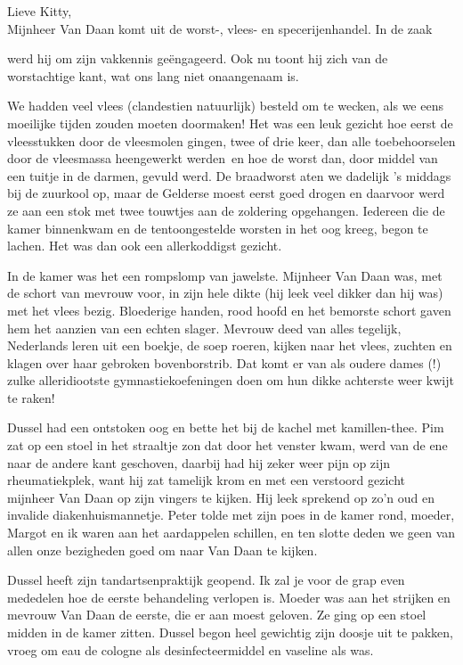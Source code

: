 \documentclass{book}
\begin{document}
Lieve Kitty,\\Mijnheer Van Daan komt uit de worst-, vlees- en
specerijenhandel. In de zaak

werd hij om zijn vakkennis geëngageerd. Ook nu toont hij zich van de
worstachtige kant, wat ons lang niet onaangenaam is.

We hadden veel vlees (clandestien natuurlijk) besteld om te wecken, als
we eens moeilijke tijden zouden moeten doormaken! Het was een leuk
gezicht hoe eerst de vleesstukken door de vleesmolen gingen, twee of
drie keer, dan alle toebehoorselen door de vleesmassa heengewerkt
werden~en hoe de worst dan, door middel van een tuitje in de darmen,
gevuld werd. De braadworst aten we dadelijk 's middags bij de zuurkool
op, maar de Gelderse moest eerst goed drogen en daarvoor werd ze aan een
stok met twee touwtjes aan de zoldering opgehangen. Iedereen die de
kamer binnenkwam en de tentoongestelde worsten in het oog kreeg, begon
te lachen. Het was dan ook een allerkoddigst gezicht.

In de kamer was het een rompslomp van jawelste. Mijnheer Van Daan was,
met de schort van mevrouw voor, in zijn hele dikte (hij leek veel dikker
dan hij was) met het vlees bezig. Bloederige handen, rood hoofd en het
bemorste schort gaven hem het aanzien van een echten slager. Mevrouw
deed van alles tegelijk, Nederlands leren uit een boekje, de soep
roeren, kijken naar het vlees, zuchten en klagen over haar gebroken
bovenborstrib. Dat komt er van als oudere dames (!) zulke alleridiootste
gymnastiekoefeningen doen om hun dikke achterste weer kwijt te raken!

Dussel had een ontstoken oog en bette het bij de kachel met
kamillen-thee. Pim zat op een stoel in het straaltje zon dat door het
venster kwam, werd van de ene naar de andere kant geschoven, daarbij had
hij zeker weer pijn op zijn rheumatiekplek, want hij zat tamelijk krom
en met een verstoord gezicht mijnheer Van Daan op zijn vingers te
kijken. Hij leek sprekend op zo'n oud en invalide diakenhuismannetje.
Peter tolde met zijn poes in de kamer rond, moeder, Margot en ik waren
aan het aardappelen schillen, en ten slotte deden we geen van allen onze
bezigheden goed om naar Van Daan te kijken.

Dussel heeft zijn tandartsenpraktijk geopend. Ik zal je voor de grap
even mededelen hoe de eerste behandeling verlopen is. Moeder was aan het
strijken en mevrouw Van Daan de eerste, die er aan moest geloven. Ze
ging op een stoel midden in de kamer zitten. Dussel begon heel gewichtig
zijn doosje uit te pakken, vroeg om eau de cologne als
desinfecteermiddel en vaseline als was.
\end{document}

